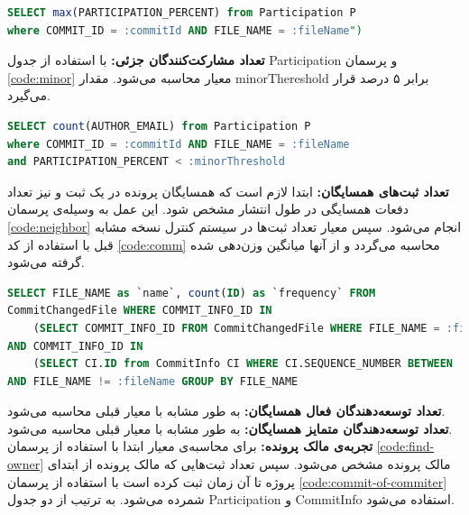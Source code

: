 \begin{latin}
	\begin{lstlisting}[language=SQL]
SELECT max(PARTICIPATION_PERCENT) from Participation P 
where COMMIT_ID = :commitId AND FILE_NAME = :fileName")
\end{lstlisting}
\end{latin}
\label{code:own}

\textbf{تعداد مشارکت‌کنندگان جزئی:‬}
 با استفاده از جدول Participation و پرسمان  \ref{code:minor}  معیار محاسبه می‌شود. مقدار minorThereshold برابر ۵ درصد قرار می‌گیرد.

\begin{latin}
	\begin{lstlisting}[language=SQL]
SELECT count(AUTHOR_EMAIL) from Participation P 
where COMMIT_ID = :commitId AND FILE_NAME = :fileName
and PARTICIPATION_PERCENT < :minorThreshold
\end{lstlisting}
\end{latin}
\label{code:minor}

\textbf{تعداد ثبت‌های همسایگان:‬}
ابتدا لازم است که همسایگان پرونده در یک ثبت و نیز تعداد دفعات همسایگی در طول انتشار مشخص شود. این عمل به وسیله‌ی پرسمان \ref{code:neighbor} انجام می‌شود. سپس معیار تعداد ثبت‌ها در سیستم کنترل نسخه مشابه قبل با استفاده از کد \ref{code:comm} محاسبه می‌گردد و از آنها میانگین وزن‌دهی شده گرفته می‌شود.

\begin{latin}
\begin{lstlisting}[language=SQL]
SELECT FILE_NAME as `name`, count(ID) as `frequency` FROM
CommitChangedFile WHERE COMMIT_INFO_ID IN
	(SELECT COMMIT_INFO_ID FROM CommitChangedFile WHERE FILE_NAME = :fileName) 
AND COMMIT_INFO_ID IN
	(SELECT CI.ID from CommitInfo CI WHERE CI.SEQUENCE_NUMBER BETWEEN :startSeq AND :endSeq AND PROJECT = :project)
AND FILE_NAME != :fileName GROUP BY FILE_NAME
\end{lstlisting}
\end{latin}
\label{code:neighbor}

\textbf{تعداد توسعه‌دهندگان فعال همسایگان:‬}
 به طور مشابه با معیار قبلی محاسبه می‌شود.\\
\textbf{‫تعداد توسعه‌دهندگان متمایز همسایگان:‬}
 به طور مشابه با معیار قبلی محاسبه می‌شود. \\

\textbf{تجربه‌ی مالک پرونده:‬‬}
 برای محاسبه‌ی معیار ابتدا   با استفاده از پرسمان \ref{code:find-owner} مالک پرونده مشخص می‌شود. سپس تعداد ثبت‌هایی که مالک پرونده از ابتدای پروژه تا آن زمان ثبت کرده است  با استفاده از پرسمان \ref{code:commit-of-commiter} شمرده می‌شود. به ترتیب از دو جدول Participation 
 و 
 CommitInfo  استفاده می‌شود.

